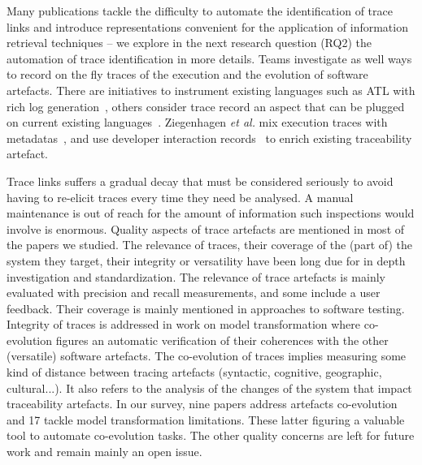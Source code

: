 Many publications tackle the difficulty to automate the identification of trace links and introduce representations convenient for the application of information retrieval techniques -- we explore in the next research question (RQ2) the automation of trace identification in more details. Teams investigate as well ways to {record} on the fly traces of the execution and the evolution of software artefacts. There are initiatives to instrument existing languages such as ATL with rich log generation~\cite{Santiago_2013,la_Fosse_2018}, others consider trace record an aspect that can be plugged on current existing languages~\cite{Pfeiffer_2014,Santiago_2013}. Ziegenhagen \textit{et al.} mix execution traces with metadatas~\cite{ziegenhagen2020-expanding-tracea-with-dynamic-tracing-data}, and use developer interaction records~\cite{ziegenhagen2019-developer-tool-interaction} to enrich existing traceability artefact.


Trace links suffers a gradual decay that must be considered seriously to avoid having to re-elicit traces every time they need be analysed. A manual maintenance is out of reach for the amount of information such inspections would involve is enormous. Quality aspects of trace artefacts are mentioned in most of the papers we studied. The relevance of traces, their coverage of the (part of) the system they target, their integrity or versatility have been long due for in depth investigation and standardization. The relevance of trace artefacts is mainly evaluated with precision and recall measurements, and some include a user feedback. Their coverage is mainly mentioned in approaches to software testing. Integrity of traces is addressed in work on model transformation where co-evolution figures an automatic verification of their coherences with the other (versatile) software artefacts. The co-evolution of traces implies measuring some kind of distance between tracing artefacts (syntactic, cognitive, geographic, cultural...). It also refers to the analysis of the changes of the system that impact traceability artefacts. In our survey, nine papers address artefacts co-evolution and 17 tackle model transformation limitations. These latter figuring a valuable tool to automate co-evolution tasks. The other quality concerns are left for future work and remain mainly an open issue.

